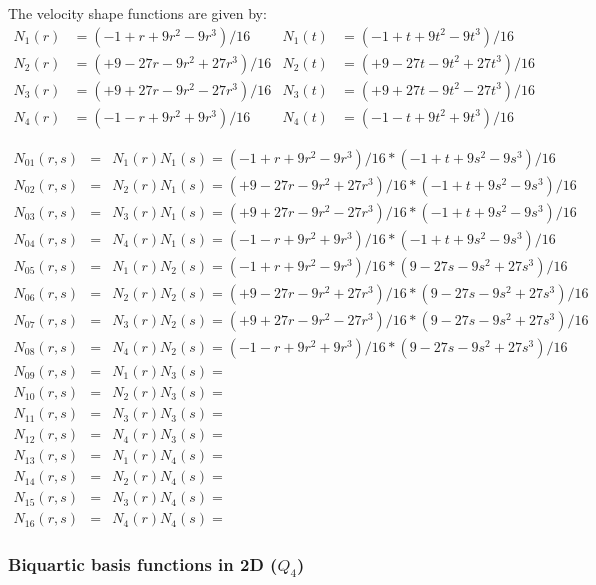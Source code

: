 The velocity shape functions are given by:
\begin{align}
N_1(r)&=(-1   +r +9r^2 - 9r^3)/16 & 
N_1(t)&=(-1   +t +9t^2 - 9t^3)/16 \nonumber\\
N_2(r)&=(+9 -27r -9r^2 +27r^3)/16 &
N_2(t)&=(+9 -27t -9t^2 +27t^3)/16 \nonumber\\
N_3(r)&=(+9 +27r -9r^2 -27r^3)/16 &
N_3(t)&=(+9 +27t -9t^2 -27t^3)/16 \nonumber\\
N_4(r)&=(-1   -r +9r^2 + 9r^3)/16 &
N_4(t)&=(-1   -t +9t^2 + 9t^3)/16 \nonumber
\end{align}


\begin{mdframed}[backgroundcolor=blue!5]
\begin{eqnarray}
N_{01}(r,s)&=&N_1(r)N_1(s) = (-1   +r +9r^2 - 9r^3)/16 * (-1  +t +9s^2 - 9s^3)/16 \nonumber\\
N_{02}(r,s)&=&N_2(r)N_1(s) = (+9 -27r -9r^2 +27r^3)/16 * (-1  +t +9s^2 - 9s^3)/16 \nonumber\\
N_{03}(r,s)&=&N_3(r)N_1(s) = (+9 +27r -9r^2 -27r^3)/16 * (-1  +t +9s^2 - 9s^3)/16 \nonumber\\
N_{04}(r,s)&=&N_4(r)N_1(s) = (-1   -r +9r^2 + 9r^3)/16 * (-1  +t +9s^2 - 9s^3)/16 \nonumber\\
N_{05}(r,s)&=&N_1(r)N_2(s) = (-1   +r +9r^2 - 9r^3)/16 * (9 -27s -9s^2 +27s^3)/16 \nonumber\\
N_{06}(r,s)&=&N_2(r)N_2(s) = (+9 -27r -9r^2 +27r^3)/16 * (9 -27s -9s^2 +27s^3)/16 \nonumber\\
N_{07}(r,s)&=&N_3(r)N_2(s) = (+9 +27r -9r^2 -27r^3)/16 * (9 -27s -9s^2 +27s^3)/16 \nonumber\\
N_{08}(r,s)&=&N_4(r)N_2(s) = (-1   -r +9r^2 + 9r^3)/16 * (9 -27s -9s^2 +27s^3)/16 \nonumber\\
N_{09}(r,s)&=&N_1(r)N_3(s) =\\
N_{10}(r,s)&=&N_2(r)N_3(s) =\\
N_{11}(r,s)&=&N_3(r)N_3(s) =\\
N_{12}(r,s)&=&N_4(r)N_3(s) =\\
N_{13}(r,s)&=&N_1(r)N_4(s) =\\
N_{14}(r,s)&=&N_2(r)N_4(s) =\\
N_{15}(r,s)&=&N_3(r)N_4(s) =\\
N_{16}(r,s)&=&N_4(r)N_4(s) =
\end{eqnarray}
\end{mdframed}


\subsubsection{Biquartic basis functions in 2D ($Q_4$)}

